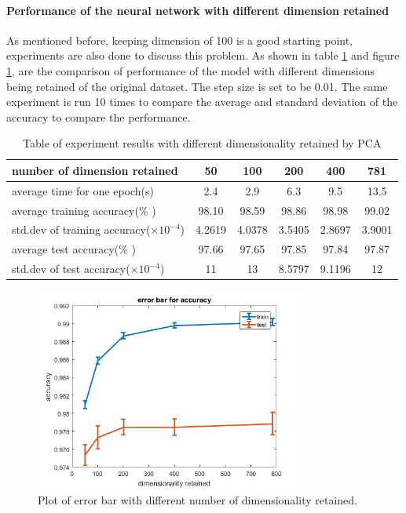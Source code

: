 \documentclass[conference]{IEEEtran}
\begin{document}

\paragraph{Performance of the neural network with different dimension retained}
As mentioned before, keeping dimension of 100 is a good starting point, experiments are also done to discuss this problem. As shown in table \ref{tab: t2} and figure \ref{errorBarPCA}, are the comparison of performance of the model with different dimensions being retained of the original dataset. The step size is set to be 0.01. The same experiment is run 10 times to compare the average and standard deviation of the accuracy to compare the performance.\\
\begin{table}[h!]
\centering
\begin{tabular}{lccccc}
\hline
number of dimension retained & 50 & 100 & 200 & 400 & 781\\
\hline
average time for one epoch(s) &  2.4 &  2.9 & 6.3 & 9.5 & 13.5\\
average training accuracy(\% )  & 98.10 &  98.59 & 98.86 & 98.98 & 99.02\\
std.dev of training accuracy($\times 10^{-4}$) & 4.2619 & 4.0378 & 3.5405 & 2.8697 & 3.9001\\
average test accuracy(\% ) & 97.66 & 97.65 & 97.85 & 97.84 & 97.87\\
std.dev of test accuracy($\times 10^{-4}$) & 11 & 13 & 8.5797 & 9.1196 & 12\\
\hline
\end{tabular}
\caption{Table of experiment results with different dimensionality retained by PCA}
\label{tab: t2}
\end{table}

\begin{figure}[h!]
\centerline{\includegraphics[width=3.5in]{PCAerrorBar.jpg}}
\caption{Plot of error bar with different number of dimensionality retained.}
\label{errorBarPCA}
\end{figure}
\end{document}
